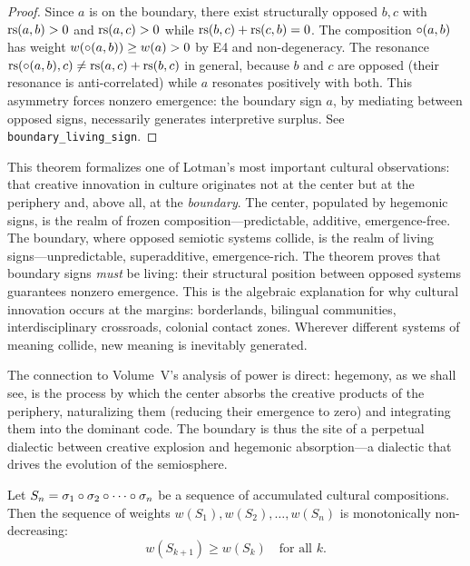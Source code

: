 \begin{proof}
Since $a$ is on the boundary, there exist structurally opposed $b, c$ with $\mathrm{rs}(a, b) > 0$ and $\mathrm{rs}(a, c) > 0$ while $\mathrm{rs}(b, c) + \mathrm{rs}(c, b) = 0$. The composition $\circ(a, b)$ has weight $w(\circ(a, b)) \geq w(a) > 0$ by E4 and non-degeneracy. The resonance $\mathrm{rs}(\circ(a, b), c) \neq \mathrm{rs}(a, c) + \mathrm{rs}(b, c)$ in general, because $b$ and $c$ are opposed (their resonance is anti-correlated) while $a$ resonates positively with both. This asymmetry forces nonzero emergence: the boundary sign $a$, by mediating between opposed signs, necessarily generates interpretive surplus. See \texttt{boundary\_living\_sign}.
\end{proof}

\begin{interpretation}
This theorem formalizes one of Lotman's most important cultural observations: that creative innovation in culture originates not at the center but at the periphery and, above all, at the \emph{boundary}. The center, populated by hegemonic signs, is the realm of frozen composition---predictable, additive, emergence-free. The boundary, where opposed semiotic systems collide, is the realm of living signs---unpredictable, superadditive, emergence-rich. The theorem proves that boundary signs \emph{must} be living: their structural position between opposed systems guarantees nonzero emergence. This is the algebraic explanation for why cultural innovation occurs at the margins: borderlands, bilingual communities, interdisciplinary crossroads, colonial contact zones. Wherever different systems of meaning collide, new meaning is inevitably generated.

The connection to Volume~V's analysis of power is direct: hegemony, as we shall see, is the process by which the center absorbs the creative products of the periphery, naturalizing them (reducing their emergence to zero) and integrating them into the dominant code. The boundary is thus the site of a perpetual dialectic between creative explosion and hegemonic absorption---a dialectic that drives the evolution of the semiosphere.
\end{interpretation}

\begin{theorem}
\label{thm:weight-monotone-expansion}
Let $S_n = \sigma_1 \circ \sigma_2 \circ \cdots \circ \sigma_n$ be a sequence of accumulated cultural compositions. Then the sequence of weights $w(S_1), w(S_2), \ldots, w(S_n)$ is monotonically non-decreasing:
\[
  w(S_{k+1}) \geq w(S_k) \quad \text{for all } k.
\]
\end{theorem}

